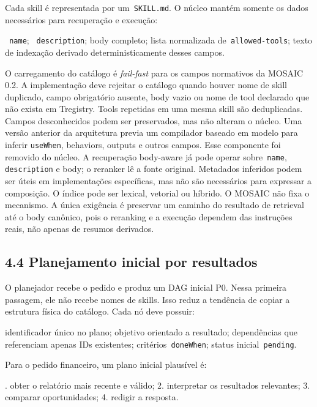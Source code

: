 \documentclass[12pt,a4paper]{article}
\begin{document}
Cada skill é representada por um\texttt{ SKILL.md}. O núcleo mantém somente os dados necessários para recuperação e execução:


\noindent \textbullet{}\texttt{ name}; \textbullet{}\texttt{ description}; \textbullet{} body completo; \textbullet{} lista normalizada de\texttt{ allowed-tools}; \textbullet{} texto de indexação derivado deterministicamente desses campos.\par

O carregamento do catálogo é\textit{ fail-fast} para os campos normativos da MOSAIC 0.2. A implementação deve rejeitar o catálogo quando houver nome de skill duplicado, campo obrigatório ausente, body vazio ou nome de tool declarado que não exista em Tregistry. Tools repetidas em uma mesma skill são deduplicadas. Campos desconhecidos podem ser preservados, mas não alteram o núcleo. Uma versão anterior da arquitetura previa um compilador baseado em modelo para inferir \texttt{useWhen}, behaviors, outputs e outros campos. Esse componente foi removido do núcleo. A recuperação body-aware já pode operar sobre\texttt{ name},\texttt{ description} e body; o reranker lê a fonte original. Metadados inferidos podem ser úteis em implementações específicas, mas não são necessários para expressar a composição. O índice pode ser lexical, vetorial ou híbrido. O MOSAIC não fixa o mecanismo. A única exigência é preservar um caminho do resultado de retrieval até o body canônico, pois o reranking e a execução dependem das instruções reais, não apenas de resumos derivados.


\subsection*{4.4 Planejamento inicial por resultados}

O planejador recebe o pedido e produz um DAG inicial P0. Nessa primeira passagem, ele não recebe nomes de skills. Isso reduz a tendência de copiar a estrutura física do catálogo. Cada nó deve possuir:


\noindent \textbullet{} identificador único no plano; \textbullet{} objetivo orientado a resultado; \textbullet{} dependências que referenciam apenas IDs existentes; \textbullet{} critérios\texttt{ doneWhen}; \textbullet{} status inicial\texttt{ pending}.\par

Para o pedido financeiro, um plano inicial plausível é:


. obter o relatório mais recente e válido; 2. interpretar os resultados relevantes; 3. comparar oportunidades; 4. redigir a resposta.\par
\end{document}
